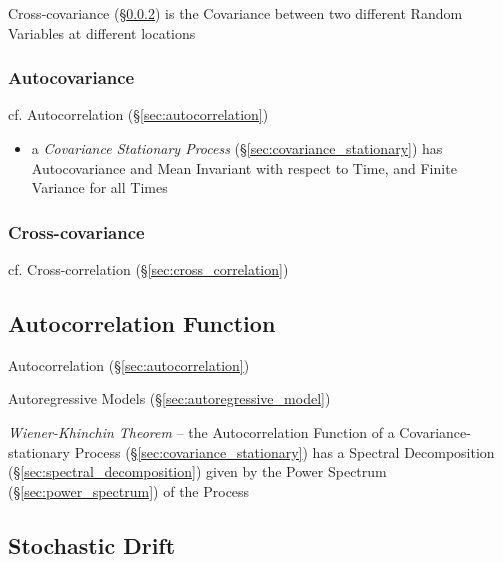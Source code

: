 Cross-covariance (\S\ref{sec:cross_covariance}) is the Covariance between two
different Random Variables at different locations



\subsubsection{Autocovariance}\label{sec:autocovariance}

cf. Autocorrelation (\S\ref{sec:autocorrelation}) %

\begin{itemize}
  \item a \emph{Covariance Stationary Process}
    (\S\ref{sec:covariance_stationary}) has Autocovariance and Mean
    Invariant with respect to Time, and Finite Variance for all Times
\end{itemize}



\subsubsection{Cross-covariance}\label{sec:cross_covariance}

cf. Cross-correlation (\S\ref{sec:cross_correlation})



\subsection{Autocorrelation Function}\label{sec:autocorrelation_function}

Autocorrelation (\S\ref{sec:autocorrelation})

Autoregressive Models (\S\ref{sec:autoregressive_model})

\emph{Wiener-Khinchin Theorem} -- the Autocorrelation Function of a
Covariance-stationary Process (\S\ref{sec:covariance_stationary}) has a Spectral
Decomposition (\S\ref{sec:spectral_decomposition}) given by the Power Spectrum
(\S\ref{sec:power_spectrum}) of the Process



\subsection{Stochastic Drift}\label{sec:stochastic_drift}

